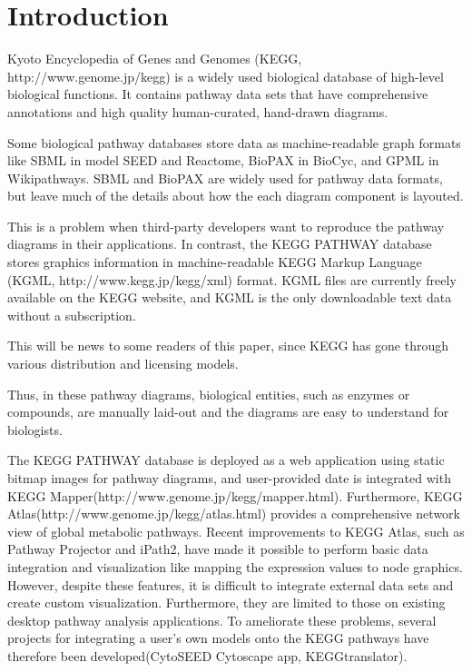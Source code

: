 \documentclass[10pt,a4paper,twocolumn]{article}
\begin{document}
\section*{Introduction}

Kyoto Encyclopedia of Genes and Genomes (KEGG, http://www.genome.jp/kegg) \cite{kanehisa2014data} is a widely used biological database of high-level biological functions. It contains pathway data sets that have comprehensive annotations and high quality human-curated, hand-drawn diagrams.

Some biological pathway databases store data as machine-readable graph formats like SBML\cite{hucka2003systems} in model SEED\cite{henry2010high} and Reactome\cite{croft2014reactome}, BioPAX\cite{demir2010biopax} in BioCyc\cite{caspi2014metacyc}, and GPML in Wikipathways\cite{kelder2012wikipathways}.
SBML and BioPAX are widely used for pathway data formats, but leave much of the details about how the each diagram component is layouted.

This is a problem when third-party developers want to reproduce the pathway diagrams in their applications.  In contrast, the KEGG PATHWAY database stores graphics information in machine-readable KEGG Markup Language (KGML, http://www.kegg.jp/kegg/xml) format. KGML files are currently freely available on the KEGG website, and KGML is the only downloadable text data without a subscription.

This will be news to some readers of this paper, since KEGG has gone through various distribution and licensing models.


Thus, in these pathway diagrams, biological entities, such as enzymes or compounds, are manually laid-out and the diagrams are easy to understand for biologists. 

The KEGG PATHWAY database is deployed as a web application using static bitmap images for pathway diagrams, and user-provided date is integrated with KEGG Mapper(http://www.genome.jp/kegg/mapper.html). Furthermore, KEGG Atlas(http://www.genome.jp/kegg/atlas.html) provides a comprehensive network view of global metabolic pathways. Recent improvements to KEGG Atlas, such as Pathway Projector\cite{kono2009pathway} and iPath2\cite{yamada2011ipath2}, have made it possible to perform basic data integration and visualization like mapping the expression values to node graphics. However, despite these features, it is difficult to integrate external data sets and create custom visualization. Furthermore, they are limited to those on existing desktop pathway analysis applications. To ameliorate these problems, several projects for integrating a user's own models onto the KEGG pathways have therefore been developed(CytoSEED Cytoscape app\cite{dejongh2012cytoseed}, KEGGtranslator\cite{wrzodek2011keggtranslator}).\newline
\end{document}
